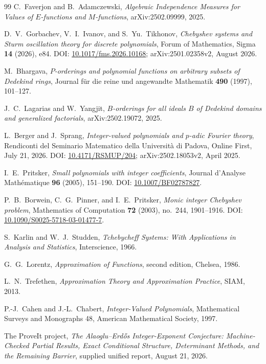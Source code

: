 \documentclass[11pt,oneside]{article}
\theoremstyle{definition}
\theoremstyle{remark}
\begin{document}
\begin{thebibliography}{99}
C.~Faverjon and B.~Adamczewski,
\newblock \emph{Algebraic Independence Measures for Values of $E$-functions and
$M$-functions},
\newblock arXiv:2502.09999, 2025.

D.~V.~Gorbachev, V.~I.~Ivanov, and S.~Yu.~Tikhonov,
\newblock \emph{Chebyshev systems and Sturm oscillation theory for discrete polynomials},
\newblock Forum of Mathematics, Sigma \textbf{14} (2026), e84.
\newblock DOI: \href{https://doi.org/10.1017/fms.2026.10168}{10.1017/fms.2026.10168};
\newblock arXiv:2501.02358v2, August 2026.

M.~Bhargava,
\newblock \emph{$P$-orderings and polynomial functions on arbitrary subsets of Dedekind
rings},
\newblock Journal f\"ur die reine und angewandte Mathematik \textbf{490} (1997), 101--127.

J.~C.~Lagarias and W.~Yangjit,
\newblock \emph{$B$-orderings for all ideals $B$ of Dedekind domains and generalized
factorials},
\newblock arXiv:2502.19072, 2025.

L.~Berger and J.~Sprang,
\newblock \emph{Integer-valued polynomials and $p$-adic Fourier theory},
\newblock Rendiconti del Seminario Matematico della Universit\`a di Padova,
Online First, July 21, 2026.
\newblock DOI: \href{https://doi.org/10.4171/RSMUP/204}{10.4171/RSMUP/204};
\newblock arXiv:2502.18053v2, April 2025.

I.~E.~Pritsker,
\newblock \emph{Small polynomials with integer coefficients},
\newblock Journal d'Analyse Math\'ematique \textbf{96} (2005), 151--190.
\newblock DOI: \href{https://doi.org/10.1007/BF02787827}{10.1007/BF02787827}.

P.~B.~Borwein, C.~G.~Pinner, and I.~E.~Pritsker,
\newblock \emph{Monic integer Chebyshev problem},
\newblock Mathematics of Computation \textbf{72} (2003), no.~244, 1901--1916.
\newblock DOI: \href{https://doi.org/10.1090/S0025-5718-03-01477-7}{10.1090/S0025-5718-03-01477-7}.

S.~Karlin and W.~J.~Studden,
\newblock \emph{Tchebycheff Systems: With Applications in Analysis and Statistics},
\newblock Interscience, 1966.

G.~G.~Lorentz,
\newblock \emph{Approximation of Functions},
\newblock second edition, Chelsea, 1986.

L.~N.~Trefethen,
\newblock \emph{Approximation Theory and Approximation Practice},
\newblock SIAM, 2013.

P.-J.~Cahen and J.-L.~Chabert,
\newblock \emph{Integer-Valued Polynomials},
\newblock Mathematical Surveys and Monographs 48, American Mathematical Society, 1997.

The ProveIt project,
\newblock \emph{The Alaoglu--Erd\H{o}s Integer-Exponent Conjecture: Machine-Checked Partial
Results, Exact Conditional Structure, Determinant Methods, and the Remaining Barrier},
\newblock supplied unified report, August 21, 2026.

\end{thebibliography}
\end{document}
